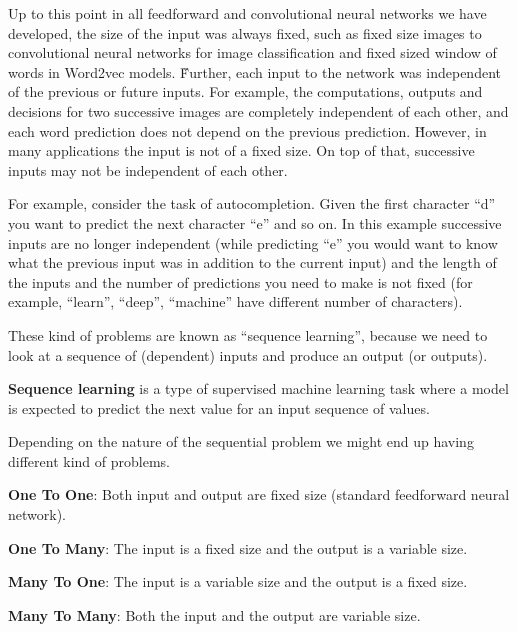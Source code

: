 Up to this point in all feedforward and convolutional neural networks we have developed, the size of the input was
always fixed, such as fixed size images to convolutional neural networks for image classification and fixed sized
window of words in Word2vec models. \v

Further, each input to the network was independent of the previous or future inputs. For example, the computations,
outputs and decisions for two successive images are completely independent of each other, and each word prediction
does not depend on the previous prediction. \v

However, in many applications the input is not of a fixed size. On top of that, successive inputs may not be
independent of each other.

\be
For example, consider the task of autocompletion. Given the first character ``d'' you want to predict the next
character ``e'' and so on. In this example successive inputs are no longer independent (while predicting ``e''
you would want to know what the previous input was in addition to the current input) and the length of the inputs and
the number of predictions you need to make is not fixed (for example, ``learn'', ``deep'', ``machine'' have different
number of characters).

\vspace{-10pt}
\ee

These kind of problems are known as ``sequence learning'', because we need to look at a sequence of (dependent)
inputs and produce an output (or outputs).

\textbf{Sequence learning} is a type of supervised machine learning task where a model is expected to predict the next
value for an input sequence of values.
\ed

Depending on the nature of the sequential problem we might end up having different kind of problems.
\bit
\item \textbf{One To One}: Both input and output are fixed size (standard feedforward neural network).
\item \textbf{One To Many}: The input is a fixed size and the output is a variable size.
\item \textbf{Many To One}: The input is a variable size and the output is a fixed size.
\item \textbf{Many To Many}: Both the input and the output are variable size.
\eit


